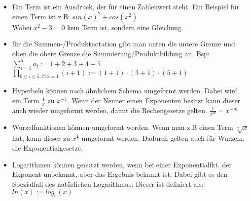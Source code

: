 \begin{framed} [Zusammenfassung]
  \begin{itemize}
    \item
      Ein Term ist ein Ausdruck, der für einen Zahlenwert steht. Ein Beispiel für 
      einen Term ist z.B: $sin(x)^2 + cos(x^2)$\\
      Wobei $x^2 - 3 = 0$ kein Term ist, sondern eine Gleichung.

    \item
      für die Summen-/Produktnotation gibt man unten die untere Grenze und oben 
      die obere Grenze die Summierung/Produktbildung an. Bsp:\\
      $\sum_{i=1}^{5}a_i := 1 + 2 + 3 + 4 + 5$\\
      $\prod_{0\leq i\leq 5, i\%2=1}^{} (i + 1):= (1 + 1) \cdot (3 + 1) 
      \cdot (5 + 1)$

    \item
      Hyperbeln können nach ähnlichem Schema umgeformt werden. Dabei wird ein Term 
      $\frac{1}{x}$ zu $x^{-1}$. Wenn der Nenner einen Exponenten besitzt kann 
      dieser auch wieder umgeformt werden, damit die Rechengesetze gelten.	
      $\frac{1}{x^m} = x^{-m}$

    \item
      Wurzelfunktionen können umgeformt werden. Wenn man z.B einen Term
      $\sqrt[2]{x}$ hat, kann dieser zu $x^\frac{1}{2}$ umgeformt werden. Dadurch
      gelten auch für Wurzeln, die Exponentialgesetze.	

    \item
      Logarithmen können genutzt werden, wenn bei einer Exponentialfkt. der 
      Exponent unbekannt, aber das Ergebnis bekannt ist. Dabei gibt es den 
      Spezialfall des natürlichen Logarithmus. Dieser ist definiert als:\\
      $ln(x) := log_e(x)$
  \end{itemize}
\end{framed}


%		
%		
